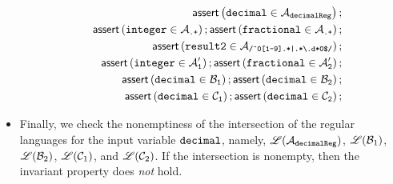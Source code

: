 \begin{itemize}
\begin{eqnarray}\label{eqn:exmp-2}
& & \textsf{assert}\left(\tt decimal \in \mathcal{A}_{decimalReg}\right);\nonumber \\
&&  \textsf{assert}\left(\tt integer \in \mathcal{A}_{\scriptsize\mbox{\tt.+}}\right); 
  \textsf{assert}\left(\tt fractional \in \mathcal{A}_{\scriptsize\mbox{\tt.+}}\right); \nonumber\\
 && \textsf{assert}\left(\tt result2 \in \mathcal{A}_{\scriptsize\mbox{\tt /\^{}0[1-9].*|.*{\scriptsize\textbackslash}.d*0\$/}}\right); \nonumber\\
  && \textsf{assert}\left(\tt integer \in \mathcal{A}'_1\right);\textsf{assert}\left(\tt fractional \in \mathcal{A}'_2\right); \nonumber\\
    && \textsf{assert}\left(\tt decimal \in \mathcal{B}_1\right);\textsf{assert}\left(\tt decimal \in \mathcal{B}_2\right); \nonumber\\
    && \textsf{assert}\left(\tt decimal \in \mathcal{C}_1\right);\textsf{assert}\left(\tt decimal \in \mathcal{C}_2\right); 
\end{eqnarray}
%
\item Finally, we check the nonemptiness of the intersection of the regular languages for the input variable $\tt decimal$, namely, $\mathscr{L}(\mathcal{A}_{\tt decimalReg})$, $\mathscr{L}(\mathcal{B}_1)$, $\mathscr{L}(\mathcal{B}_2)$, $\mathscr{L}(\mathcal{C}_1)$, and $\mathscr{L}(\mathcal{C}_2)$. If the intersection is nonempty, then the invariant property does \emph{not} hold.
\end{itemize}
